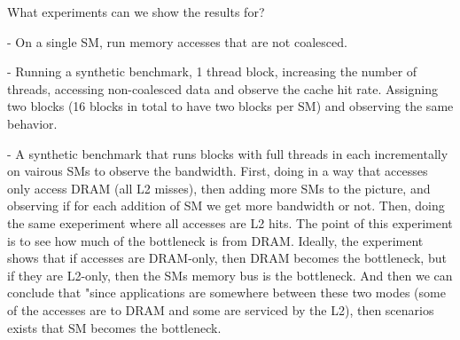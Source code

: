 What experiments can we show the results for?

- On a single SM, run memory accesses that are not coalesced.

- Running a synthetic benchmark, 1 thread block, increasing the number of threads, accessing non-coalesced data and 
observe the cache hit rate. Assigning two blocks (16 blocks in total to have two blocks per SM) and observing the same 
behavior.


- A synthetic benchmark that runs blocks with full threads in each incrementally on vairous SMs to observe the bandwidth.
First, doing in a way that accesses only access DRAM (all L2 misses), then adding more SMs to the picture, and observing if 
for each addition of SM we get more bandwidth or not. Then, doing the same exeperiment where all accesses are L2 hits. The point
of this experiment is to see how much of the bottleneck is from DRAM. Ideally, the experiment shows that if accesses are DRAM-only,
then DRAM becomes the bottleneck, but if they are L2-only, then the SMs memory bus is the bottleneck. And then we can 
conclude that "since applications are somewhere between these two modes (some of the accesses are to DRAM and some are serviced
by the L2), then scenarios exists that SM becomes the bottleneck.




